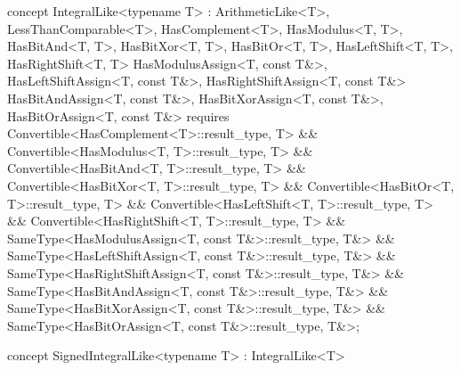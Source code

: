 \documentclass[american,twoside]{book}
\begin{document}
\begin{itemdescr}
\pnum
{}
\end{itemdescr}

\begin{itemdecl}
concept IntegralLike<typename T> 
  : ArithmeticLike<T>, LessThanComparable<T>,
    HasComplement<T>, HasModulus<T, T>, HasBitAnd<T, T>, HasBitXor<T, T>, HasBitOr<T, T>,
    HasLeftShift<T, T>, HasRightShift<T, T> 
    HasModulusAssign<T, const T&>, HasLeftShiftAssign<T, const T&>, HasRightShiftAssign<T, const T&>
    HasBitAndAssign<T, const T&>, HasBitXorAssign<T, const T&>, HasBitOrAssign<T, const T&> {
  requires Convertible<HasComplement<T>::result_type, T>
        && Convertible<HasModulus<T, T>::result_type, T>
        && Convertible<HasBitAnd<T, T>::result_type, T>
        && Convertible<HasBitXor<T, T>::result_type, T>
        && Convertible<HasBitOr<T, T>::result_type, T>
        && Convertible<HasLeftShift<T, T>::result_type, T>
        && Convertible<HasRightShift<T, T>::result_type, T>
        && SameType<HasModulusAssign<T, const T&>::result_type, T&>
        && SameType<HasLeftShiftAssign<T, const T&>::result_type, T&>
        && SameType<HasRightShiftAssign<T, const T&>::result_type, T&>
        && SameType<HasBitAndAssign<T, const T&>::result_type, T&>
        && SameType<HasBitXorAssign<T, const T&>::result_type, T&>
        && SameType<HasBitOrAssign<T, const T&>::result_type, T&>;
}
\end{itemdecl}

\begin{itemdescr}
\pnum 
{}
\end{itemdescr}

\begin{itemdecl}
concept SignedIntegralLike<typename T> : IntegralLike<T> { }
\end{itemdecl}

\begin{itemdescr}
\pnum
{}

\pnum
{}
\end{itemdescr}
\end{document}
